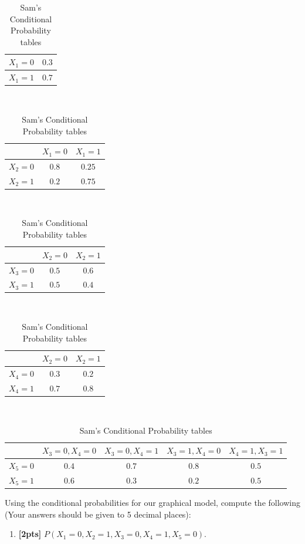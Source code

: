 \begin{enumerate}
\begin{table}[H]
    \centering
    \begin{tabular}{|c|c|}
    \hline
         $X_1=0$ & $0.3$  \\ \hline
         $X_1=1$ & $0.7$    \\  \hline
    \end{tabular}
    \\ 
    \begin{tabular}{|c|c|c|}
    \hline
            & $X_1=0$ & $X_1=1$   \\  \hline
        $X_2=0$ & $0.8$ & $0.25$ \\  \hline
        $X_2=1$ & $0.2$  & $0.75$    \\  \hline
    \end{tabular}
    \\ 
    \begin{tabular}{|c|c|c|}
    \hline
            & $X_2=0$ & $X_2=1$   \\  \hline
        $X_3=0$ & $0.5$ & $0.6$ \\  \hline
        $X_3=1$ & $0.5$  & $0.4$    \\  \hline
    \end{tabular}
    \\ 
    \begin{tabular}{|c|c|c|}
    \hline
            & $X_2=0$ & $X_2=1$   \\  \hline
        $X_4=0$ & $0.3$ & $0.2$ \\  \hline
        $X_4=1$ & $0.7$  & $0.8$    \\  \hline
    \end{tabular}
    \\ 
    \begin{tabular}{|c|c|c|c|c|}
    \hline
            & $X_3=0, X_4=0$ & $X_3=0,X_4=1$ & $X_3=1,X_4=0$ & $X_4=1,X_3=1$   \\  \hline
        $X_5=0$ & $0.4$ & $0.7$ & $0.8$ & $0.5$ \\  \hline
        $X_5=1$ & $0.6$  & $0.3$ & $0.2$ & $0.5$    \\  \hline
    \end{tabular}
    \caption{Sam's Conditional Probability tables}
\end{table}

Using the conditional probabilities for our graphical model, compute the following (Your answers should be given to 5 decimal places): 
\begin{enumerate}
\item \textbf{[2pts]} $P(X_1=0, X_2=1, X_3=0, X_4=1, X_5=0)$. 



\end{enumerate}
\end{enumerate}
